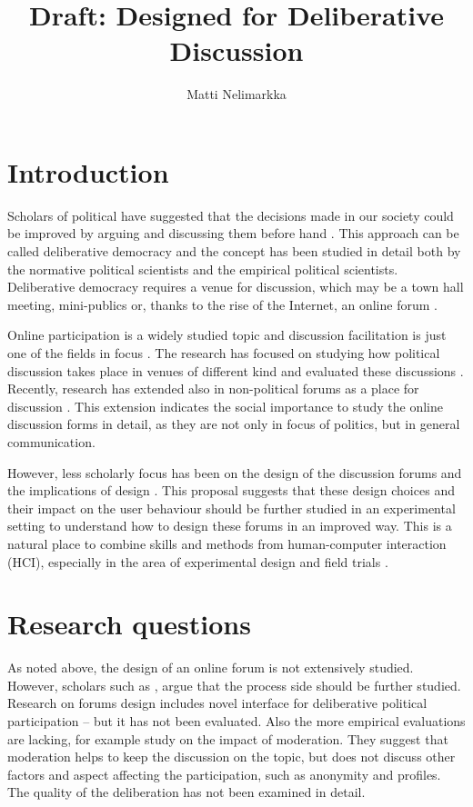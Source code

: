 \documentclass[journal,a4paper]{IEEEtran}
\author{Matti Nelimarkka}
\title{Draft: Designed for Deliberative Discussion}
\begin{document}
\maketitle

\setlength{\parindent}{0pt}
\setlength{\parskip}{1ex}

\section{Introduction}
Scholars of political have suggested that the decisions made in our society could be improved by arguing and discussing them before hand . This approach can be called deliberative democracy and the concept has been studied in detail both by the normative political scientists and the empirical political scientists. Deliberative democracy requires a venue for discussion, which may be a town hall meeting, mini-publics or, thanks to the rise of the Internet, an online forum .

Online participation is a widely studied topic and discussion facilitation is just one of the fields in focus . The research has focused on studying how political discussion takes place in venues of different kind  and evaluated these discussions . Recently, research has extended also in non-political forums as a place for discussion \cite{graham12}. This extension indicates the social importance to study the online discussion forms in detail, as they are not only in focus of politics, but in general communication.

However, less scholarly focus has been on the design of the discussion forums and the implications of design . This proposal suggests that these design choices and their impact on the user behaviour should be further studied in an experimental setting to understand how to design these forums in an improved way. This is a natural place to combine skills and methods from human-computer interaction (HCI), especially in the area of experimental design and field trials .

\section{Research questions}
As noted above, the design of an online forum is not extensively studied. However, scholars such as , argue that the process side should be further studied.  Research on forums design includes  novel interface for deliberative political participation -- but it has not been evaluated. Also the more empirical evaluations are lacking, for example  study on the impact of moderation. They suggest that moderation helps to keep the discussion on the topic, but does not discuss other factors and aspect affecting the participation, such as anonymity and profiles. The quality of the deliberation has not been examined in detail.
\end{document}
